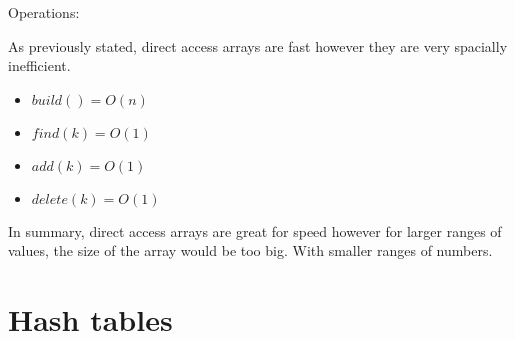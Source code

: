 \documentclass[11pt,a4paper,english]{paper}
\begin{document}
\bigskip
\begin{bluebox}{Operations:} {

    As previously stated, direct access arrays are fast however they are very spacially inefficient.

    \begin{itemize}

    \item $build() = O(n)$
    \item $find(k) = O(1)$
    \item $add(k) = O(1)$
    \item $delete(k) = O(1)$

    \end{itemize}


}\end{bluebox}

\bigskip
\noindent
In summary, direct access arrays are great for speed however for larger ranges of values, the size of the array would be too big. With smaller ranges of numbers.

\section{Hash tables}
\end{document}
